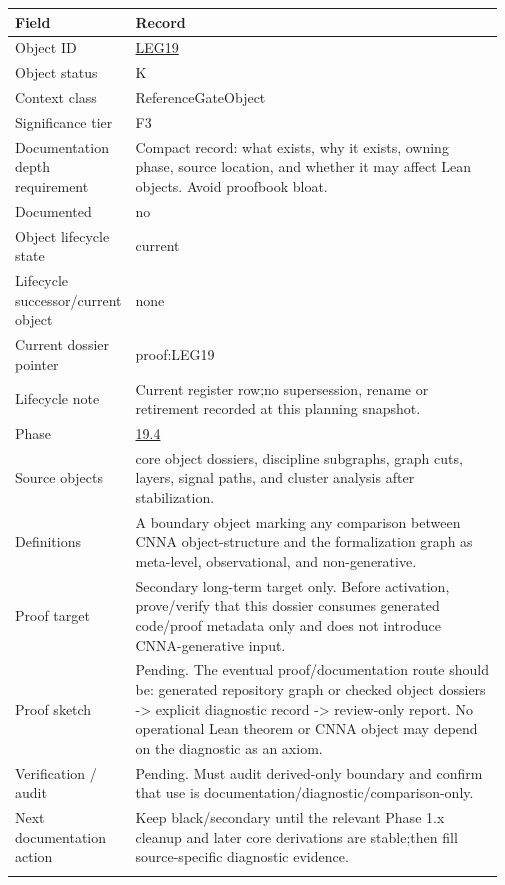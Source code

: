 \begin{longtable}{L{0.16\linewidth} L{0.81\linewidth}}
\hline
\textbf{Field} & \textbf{Record}\\
\hline
Object ID & \hyperlink{object-row-LEG19}{LEG19}\\
\hline\addlinespace[0.20em]
Object status & K\\
\hline\addlinespace[0.20em]
Context class & ReferenceGateObject\\
\hline\addlinespace[0.20em]
Significance tier & F3\\
\hline\addlinespace[0.20em]
Documentation depth requirement & Compact record: what exists, why it exists, owning phase, source location, and whether it may affect Lean objects. Avoid proofbook bloat.\\
\hline\addlinespace[0.20em]
Documented & no\\
\hline\addlinespace[0.20em]
Object lifecycle state & current\\
\hline\addlinespace[0.20em]
Lifecycle successor/\allowbreak{}current object & none\\
\hline\addlinespace[0.20em]
Current dossier pointer & proof:LEG19\\
\hline\addlinespace[0.20em]
Lifecycle note & Current register row;\newline no supersession, rename or retirement recorded at this planning snapshot.\\
\hline\addlinespace[0.20em]
Phase & \hyperlink{phase-row-19-4}{19.4}\\
\hline\addlinespace[0.20em]
Source objects & core object dossiers, discipline subgraphs, graph cuts, layers, signal paths, and cluster analysis after stabilization.\\
\hline\addlinespace[0.20em]
Definitions & A boundary object marking any comparison between CNNA object-structure and the formalization graph as meta-level, observational, and non-generative.\\
\hline\addlinespace[0.20em]
Proof target & Secondary long-term target only. Before activation, prove/\allowbreak{}verify that this dossier consumes generated code/\allowbreak{}proof metadata only and does not introduce CNNA-generative input.\\
\hline\addlinespace[0.20em]
Proof sketch & Pending. The eventual proof/\allowbreak{}documentation route should be: generated repository graph or checked object dossiers -> explicit diagnostic record -> review-only report. No operational Lean theorem or CNNA object may depend on the diagnostic as an axiom.\\
\hline\addlinespace[0.20em]
Verification /\allowbreak{} audit & Pending. Must audit derived-only boundary and confirm that use is documentation/\allowbreak{}diagnostic/\allowbreak{}comparison-only.\\
\hline\addlinespace[0.20em]
Next documentation action & Keep black/\allowbreak{}secondary until the relevant Phase 1.x cleanup and later core derivations are stable;\newline then fill source-specific diagnostic evidence.\\
\hline\addlinespace[0.20em]
\end{longtable}
